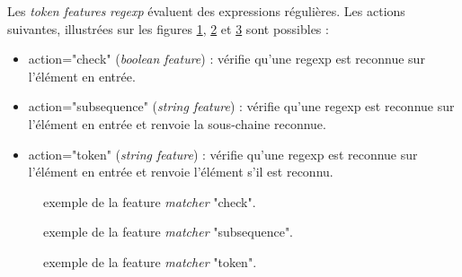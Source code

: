 \documentclass[manual-fr.tex]{subfiles}
\begin{document}
Les \textit{token features} \textit{regexp} évaluent des expressions régulières. Les actions suivantes, illustrées sur les figures \ref{fig:feature-matcher-check}, \ref{fig:feature-matcher-subsequence} et \ref{fig:feature-matcher-token} sont possibles :
\begin{itemize}
    \item action="check" (\textit{boolean feature}) : vérifie qu'une regexp est reconnue sur l'élément en entrée.
    \item action="subsequence" (\textit{string feature}) : vérifie qu'une regexp est reconnue sur l'élément en entrée et renvoie la sous-chaine reconnue.
    \item action="token" (\textit{string feature}) : vérifie qu'une regexp est reconnue sur l'élément en entrée et renvoie l'élément s'il est reconnu.
\end{itemize}

\begin{figure}[ht!]
\footnotesize
\begin{xml}
\end{xml}
\caption{exemple de la feature \textit{matcher} "check".}
\label{fig:feature-matcher-check}
\end{figure}

\begin{figure}[ht!]
\footnotesize
\begin{xml}
\end{xml}
\caption{exemple de la feature \textit{matcher} "subsequence".}
\label{fig:feature-matcher-subsequence}
\end{figure}

\begin{figure}[ht!]
\footnotesize
\begin{xml}
\end{xml}
\caption{exemple de la feature \textit{matcher} "token".}
\label{fig:feature-matcher-token}
\end{figure}
\end{document}
